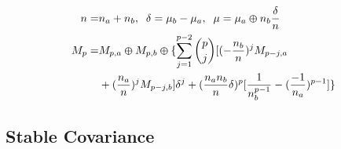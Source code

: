 
\Crunch
\begin{small}
\begin{equation}
\begin{split}
n=& n_a+n_b, \;\; \delta=\mu_b-\mu_a, \;\; \mu=\mu_a\varoplus n_b\frac{\delta}{n} \\
M_p =& M_{p,a}\varoplus M_{p,b}\varoplus \{\sum\limits_{j=1}^{p-2}{p \choose j} [(-\frac{n_b}{n})^j M_{p-j,a} \\
  & + (\frac{n_a}{n})^j M_{p-j,b}]\delta^j + (\frac{n_an_b}{n}\delta)^p[\frac{1}{n_b^{p-1}}-(\frac{-1}{n_a})^{p-1}]\}
\end{split}
\label{eq:cmeq}
\end{equation}
\end{small}
\Crunch


%


\subsection{Stable Covariance}\label{sec:covariance}

